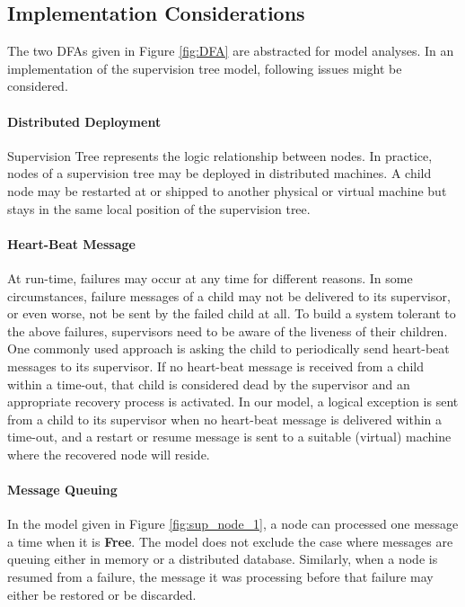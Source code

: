 \subsection{Implementation Considerations}
\label{supervision_implementaion}

The two DFAs given in Figure \ref{fig:DFA} are abstracted for model analyses.  
In an implementation of the supervision tree model, following issues might be 
considered.

\paragraph{Distributed Deployment}
Supervision Tree represents the logic relationship between nodes.  In 
practice, nodes of a supervision tree may be deployed in distributed machines.  
A child node may be restarted at or shipped to another physical or virtual 
machine but stays in the same local position of the supervision tree.


\paragraph{Heart-Beat Message}  At run-time, failures may occur at any time 
for different reasons.  In some circumstances, failure messages of a child may 
not be delivered to its supervisor, or even worse, not be sent by the failed 
child at all.  To build a system tolerant to the above failures, supervisors 
need to be aware of the liveness of their children.  One commonly used approach 
is asking the child to periodically send heart-beat messages to 
its supervisor.  If no heart-beat message is received from a child within a 
time-out, that child is considered dead by the supervisor and an appropriate 
recovery process is activated.  In our model, a logical exception is sent from a 
child to its supervisor when no heart-beat message is delivered within a 
time-out, and a restart or resume message is sent to a suitable (virtual) 
machine where the recovered node will reside.

\paragraph{Message Queuing}
In the model given in Figure \ref{fig:sup_node_1}, a node can processed one 
message a time when it is {\bf Free}.  The model does not exclude the case 
where messages are queuing either in memory or a distributed database.  
Similarly, when a node is resumed from a failure, the message it was processing 
before that failure may either be restored or be discarded.


